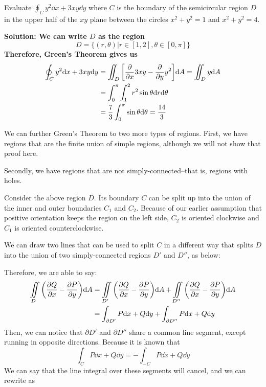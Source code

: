\begin{example}
    Evaluate $\oint_C y^2\dd x + 3xy\dd y$ where $C$ is the boundary of the semicircular region $D$ in the upper half of the $xy$ plane between the circles $x^2+y^2=1$ and $x^2+y^2=4$. \par
    \bf{Solution:} We can write $D$ as the region
    \[ D = \{ (r, \theta)|r\in[1, 2], \theta\in[0,\pi]\}\]
    Therefore, Green's Theorem gives us
    \begin{align*}
        \oint_C y^2\dd x + 3xy\dd y &= \iint_D \bqty{\pdv{x}3xy-\pdv{y}y^2}\dd A = \iint_D y\dd A\\
        &= \int_0^\pi\int_1^2 r^2\sin\theta\dd r\dd \theta \\
        &= \frac{7}{3}\int_0^\pi \sin \theta\dd \theta = \frac{14}{3}
    \end{align*}
\end{example}
We can further Green's Theorem to two more types of regions. First, we have regions that are the finite union of simple regions, although we will not show that proof here. \par
Secondly, we have regions that are not simply-connected--that is, regions with holes. 
\par
Consider the above region $D$. Its boundary $C$ can be split up into the union of the inner and outer boundaries $C_1$ and $C_2$. Because of our earlier assumption that positive orientation keeps the region on the left side, $C_2$ is oriented clockwise and $C_1$ is oriented counterclockwise. \par
We can draw two lines that can be used to split $C$ in a different way that splits $D$ into the union of two simply-connected regions $D'$ and $D''$, as below:
\par
Therefore, we are able to say:
\begin{align*}
    \iint\limits_D \pqty{\pdv{Q}{x} - \pdv{P}{y}}\dd A &= \iint\limits_{D'}\pqty{\pdv{Q}{x}-\pdv{P}{y}}\dd A + \iint\limits_{D''}\pqty{\pdv{Q}{x}-\pdv{P}{y}}\dd A \\
    &= \int_{\partial D'}P\dd x + Q\dd y + \int_{\partial D''}P\dd x + Q\dd y
    \end{align*}
Then, we can notice that $\partial D'$ and $\partial D''$ share a common line segment, except running in opposite directions. Because it is known that
\[ \int_{C}P\dd x + Q\dd y = -\int_{-C}P\dd x + Q\dd y\]
We can say that the line integral over these segments will cancel, and we can rewrite as
